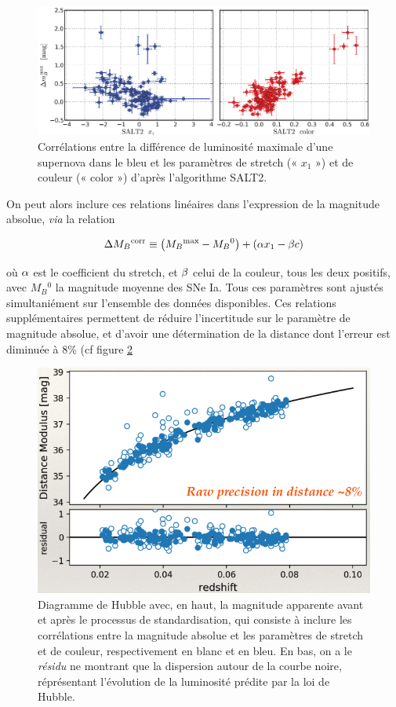 \documentclass[a4paper, 12pt, svgnames]{article}
\begin{document}
\begin{figure}[htbp!]
    \centering
    \includegraphics[width=.7\linewidth]{Rapport_figures/disp_x1_c.PNG}
    \caption{Corrélations entre la différence de luminosité maximale d'une
    supernova dans le bleu et les paramètres de stretch (« $x_1$ ») et de
couleur (« color ») d'après l'algorithme SALT2.}
    \captionsetup{justification=centering}
    \label{brighter_slower_bluer}
\end{figure}

On peut alors inclure ces relations linéaires dans l'expression de la magnitude
absolue, \textit{via} la relation

\begin{equation}
    \Delta M_B{}^{\text{corr}} \equiv \left(M_B{}^{\text{max}} - M_B{}^0\right) + \left(\alpha x_1
    - \beta c\right)
\end{equation}

où $\alpha$ est le coefficient du stretch, et $\beta$ celui de la couleur, tous les
deux positifs, avec $M_B{}^0$ la magnitude moyenne des SNe Ia. Tous ces
paramètres sont ajustés simultaniément sur l'ensemble des données disponibles.
Ces relations supplémentaires permettent de réduire l'incertitude sur le
paramètre de magnitude absolue, et d'avoir une détermination de la distance dont
l'erreur est diminuée à 8\% (cf figure \ref{disp_20}

\begin{figure}[htbp!]
    \centering
    \includegraphics[width=.5\linewidth]{Rapport_figures/disp_reduite.png}
    \captionsetup{justification=centering}
    \caption{Diagramme de Hubble avec, en haut, la magnitude apparente avant et
        après le processus de standardisation, qui consiste à inclure les
        corrélations entre la magnitude absolue et les paramètres de stretch et
        de couleur, respectivement en blanc et en bleu. En bas, on a le
        \textit{résidu} ne montrant que la dispersion autour de la courbe noire,
        réprésentant l'évolution de la luminosité prédite par la loi de Hubble.}
    \label{disp_20}
\end{figure}
\end{document}
